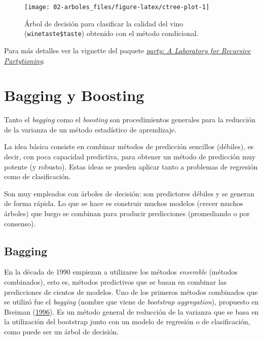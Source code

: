 \documentclass[
]{book}
\theoremstyle{break}
\theoremstyle{nonumberplain}
\begin{document}
\begin{figure}[!htb]

{\centering \texttt{[image: 02-arboles\_files/figure-latex/ctree-plot-1]} 

}

\caption{Árbol de decisión para clasificar la calidad del vino (\texttt{winetaste\$taste}) obtenido con el método condicional.}\label{fig:ctree-plot}
\end{figure}

Para más detalles ver la vignette del paquete \href{https://cran.r-project.org/web/packages/party/vignettes/party.pdf}{\emph{party: A Laboratory for Recursive Partytioning}}.

\hypertarget{bagging-boosting}{%
\chapter{Bagging y Boosting}\label{bagging-boosting}}

Tanto el \emph{bagging} como el \emph{boosting} son procedimientos generales para la reducción de la varianza de un método estadístico de aprendizaje.

La idea básica consiste en combinar métodos de predicción sencillos (débiles), es decir, con poca capacidad predictiva, para obtener un método de predicción muy potente (y robusto).
Estas ideas se pueden aplicar tanto a problemas de regresión como de clasificación.

Son muy empleados con árboles de decisión: son predictores débiles y se generan de forma rápida.
Lo que se hace es construir muchos modelos (crecer muchos árboles) que luego se combinan para producir predicciones (promediando o por consenso).

\hypertarget{bagging}{%
\section{Bagging}\label{bagging}}

En la década de 1990 empiezan a utilizarse los métodos \emph{ensemble} (métodos combinados), esto es, métodos predictivos que se basan en combinar las predicciones de cientos de modelos.
Uno de los primeros métodos combinados que se utilizó fue el \emph{bagging} (nombre que viene de \emph{bootstrap aggregation}), propuesto en Breiman (\protect\hyperlink{ref-breiman1996bagging}{1996}).
Es un método general de reducción de la varianza que se basa en la utilización del bootstrap junto con un modelo de regresión o de clasificación, como puede ser un árbol de decisión.
\end{document}
